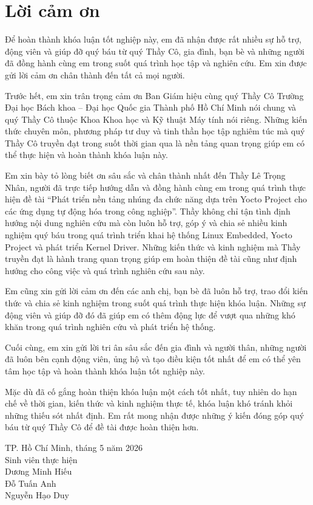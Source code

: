 \section*{\centering Lời cảm ơn}

Để hoàn thành khóa luận tốt nghiệp này, em đã nhận được rất nhiều sự hỗ trợ,
động viên và giúp đỡ quý báu từ quý Thầy Cô, gia đình, bạn bè và những người
đã đồng hành cùng em trong suốt quá trình học tập và nghiên cứu. Em xin được
gửi lời cảm ơn chân thành đến tất cả mọi người.

Trước hết, em xin trân trọng cảm ơn Ban Giám hiệu cùng quý Thầy Cô Trường
Đại học Bách khoa – Đại học Quốc gia Thành phố Hồ Chí Minh nói chung và
quý Thầy Cô thuộc Khoa Khoa học và Kỹ thuật Máy tính nói riêng. Những kiến
thức chuyên môn, phương pháp tư duy và tinh thần học tập nghiêm túc mà quý
Thầy Cô truyền đạt trong suốt thời gian qua là nền tảng quan trọng giúp em có
thể thực hiện và hoàn thành khóa luận này.

Em xin bày tỏ lòng biết ơn sâu sắc và chân thành nhất đến Thầy Lê Trọng Nhân,
người đã trực tiếp hướng dẫn và đồng hành cùng em trong quá trình thực hiện đề
tài ``Phát triển nền tảng nhúng đa chức năng dựa trên Yocto Project cho các ứng
dụng tự động hóa trong công nghiệp''. Thầy không chỉ tận tình định hướng nội
dung nghiên cứu mà còn luôn hỗ trợ, góp ý và chia sẻ nhiều kinh nghiệm quý báu
trong quá trình triển khai hệ thống Linux Embedded, Yocto Project và phát triển
Kernel Driver. Những kiến thức và kinh nghiệm mà Thầy truyền đạt là hành trang
quan trọng giúp em hoàn thiện đề tài cũng như định hướng cho công việc và quá
trình nghiên cứu sau này.

Em cũng xin gửi lời cảm ơn đến các anh chị, bạn bè đã luôn hỗ trợ, trao đổi kiến
thức và chia sẻ kinh nghiệm trong suốt quá trình thực hiện khóa luận. Những sự
động viên và giúp đỡ đó đã giúp em có thêm động lực để vượt qua những khó
khăn trong quá trình nghiên cứu và phát triển hệ thống.

Cuối cùng, em xin gửi lời tri ân sâu sắc đến gia đình và người thân, những người
đã luôn bên cạnh động viên, ủng hộ và tạo điều kiện tốt nhất để em có thể yên
tâm học tập và hoàn thành khóa luận tốt nghiệp này.

Mặc dù đã cố gắng hoàn thiện khóa luận một cách tốt nhất, tuy nhiên do hạn chế
về thời gian, kiến thức và kinh nghiệm thực tế, khóa luận khó tránh khỏi những
thiếu sót nhất định. Em rất mong nhận được những ý kiến đóng góp quý báu từ
quý Thầy Cô để đề tài được hoàn thiện hơn.

\vspace{1cm}

\begin{flushright}
TP. Hồ Chí Minh, tháng 5 năm 2026 \\
Sinh viên thực hiện\\
Dương Minh Hiếu\\
Đỗ Tuấn Anh\\
Nguyễn Hạo Duy\\
\end{flushright}
